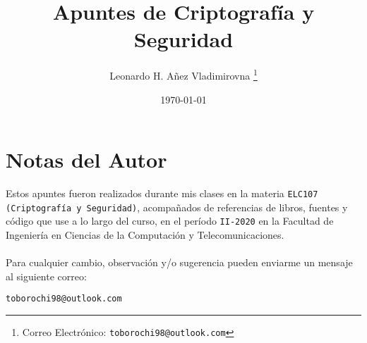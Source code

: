 

\title{Apuntes de Criptografía y Seguridad}

\author{Leonardo H. Añez Vladimirovna%
  \thanks{Correo Electrónico: \texttt{toborochi98@outlook.com}}}
\date{\today}

\maketitle


\section*{Notas del Autor}
Estos apuntes fueron realizados durante mis clases en la materia \texttt{ELC107 (Criptografía y Seguridad)}, acompañados de referencias de libros, fuentes y código que use a lo largo del curso, en el período \texttt{II-2020} en la Facultad de Ingeniería en Ciencias de la Computación y Telecomunicaciones. 
\\ \vspace{0.5cm} \\
Para cualquier cambio, observación y/o sugerencia pueden enviarme un mensaje al siguiente correo:
\begin{center}
 \texttt{toborochi98@outlook.com}
\end{center}

\tableofcontents
